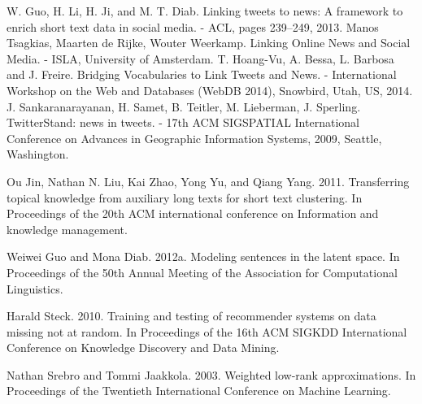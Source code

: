 \begin{thebibliography}{0}
     W. Guo, H. Li, H. Ji, and M. T. Diab. Linking tweets to news: A framework to enrich short text data in social media. - ACL, pages 239–249, 2013.
     Manos Tsagkias, Maarten de Rijke, Wouter Weerkamp. Linking Online News and Social Media. - ISLA, University of Amsterdam.
     T. Hoang-Vu, A. Bessa, L. Barbosa and J. Freire. Bridging Vocabularies to Link Tweets and News. - International Workshop on the Web and Databases (WebDB 2014), Snowbird, Utah, US, 2014.
     J. Sankaranarayanan, H. Samet, B. Teitler, M. Lieberman, J. Sperling. TwitterStand: news in tweets. - 17th ACM SIGSPATIAL International Conference on Advances in Geographic Information Systems, 2009, Seattle, Washington.

     Ou Jin, Nathan N. Liu, Kai Zhao, Yong Yu, and Qiang Yang. 2011. Transferring topical knowledge from auxiliary long texts for short text clustering. In Proceedings of the 20th ACM international conference on Information and knowledge management.

     Weiwei Guo and Mona Diab. 2012a. Modeling sentences in the latent space. In Proceedings of the 50th Annual Meeting of the Association for Computational Linguistics. 

     Harald Steck. 2010. Training and testing of recommender systems on data missing not at random. In Proceedings of the 16th ACM SIGKDD International Conference on Knowledge Discovery and Data Mining.

     Nathan Srebro and Tommi Jaakkola. 2003. Weighted low-rank approximations. In Proceedings of the Twentieth International Conference on Machine Learning.

    \hrulefill

\end{thebibliography}